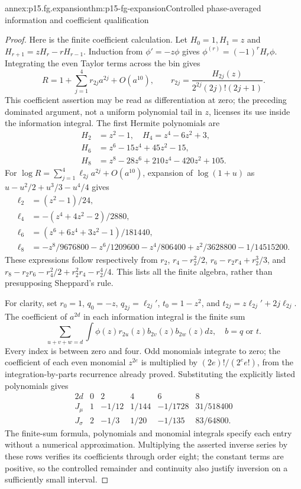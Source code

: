 \begin{annexitem}{annex:p15.fg.expansion}{thm:p15-fg-expansion}{Controlled phase-averaged information and coefficient qualification}
\begin{proof}
Here is the finite coefficient calculation. Let \(H_0=1,H_1=z\) and
\(H_{r+1}=zH_r-rH_{r-1}\). Induction from \(\phi'=-z\phi\)
gives \(\phi^{(r)}=(-1)^rH_r\phi\). Integrating the even Taylor
terms across the bin gives
\[
 R=1+\sum_{j=1}^{4}r_{2j}a^{2j}+O(a^{10}),\qquad
 r_{2j}=\frac{H_{2j}(z)}{2^{2j}(2j)!(2j+1)}.
\]
This coefficient assertion may be read as differentiation at zero;
the preceding dominated argument, not a uniform polynomial tail in \(z\),
licenses its use inside the information integral. The first Hermite
polynomials are
\[
\begin{aligned}
 H_2&=z^2-1,\quad H_4=z^4-6z^2+3,\\
 H_6&=z^6-15z^4+45z^2-15,\\
 H_8&=z^8-28z^6+210z^4-420z^2+105.
\end{aligned}
\]
For \(\log R=\sum_{j=1}^4\ell_{2j}a^{2j}+O(a^{10})\), expansion
of \(\log(1+u)\) as \(u-u^2/2+u^3/3-u^4/4\) gives
\[
\begin{aligned}
 \ell_2&=(z^2-1)/24,\\
 \ell_4&=-(z^4+4z^2-2)/2880,\\
 \ell_6&=(z^6+6z^4+3z^2-1)/181440,\\
 \ell_8&=-z^8/9676800-z^6/1209600-z^4/806400
                  +z^2/3628800-1/14515200.
\end{aligned}
\]
These expressions follow respectively from
\(r_2\), \(r_4-r_2^2/2\),
\(r_6-r_2r_4+r_2^3/3\), and
\(r_8-r_2r_6-r_4^2/2+r_2^2r_4-r_2^4/4\).
This lists all the finite algebra, rather than presupposing Sheppard's rule.

For clarity, set \(r_0=1\),
\(q_0=-z\), \(q_{2j}=\ell_{2j}'\),
\(t_0=1-z^2\), and
\(t_{2j}=z\ell_{2j}'+2j\ell_{2j}\).
The coefficient of \(a^{2d}\) in each information integral is the
finite sum
\[
 \sum_{u+v+w=d}\int\phi(z)r_{2u}(z)b_{2v}(z)b_{2w}(z)dz,
 \quad b=q\text{ or }t.
\]
Every index is between zero and four. Odd monomials integrate to zero;
the coefficient of each even monomial \(z^{2e}\) is multiplied by
\((2e)!/(2^e e!)\), from the integration-by-parts recurrence already
proved. Substituting the explicitly listed polynomials gives
\[
\begin{array}{c|rrrrr}
 2d&0&2&4&6&8\\\hline
 J_\mu&1&-1/12&1/144&-1/1728&31/518400\\
 J_\sigma&2&-1/3&1/20&-1/135&83/64800.
\end{array}
\]
The finite-sum formula, polynomials and monomial integrals specify each
entry without a numerical approximation. Multiplying the asserted inverse
series by these rows verifies its coefficients through order eight; the
constant terms are positive, so the controlled remainder and continuity
also justify inversion on a sufficiently small interval.


\end{proof}
\end{annexitem}
